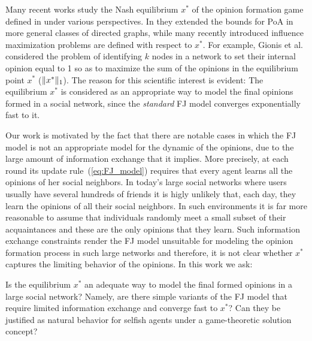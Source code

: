 Many recent works study the Nash equilibrium $x^*$
of the opinion formation game defined in \cite{BKO11}
under various perspectives. In \cite{CCL16} they extended the
bounds for PoA in more general classes of directed graphs, 
while many recently introduced influence maximization problems 
\cite{GTT13,AKPT18,MMT17} are defined with respect to $x^*$.
For example, Gionis et al. \cite{GTT13} considered the problem 
of identifying $k$ nodes in a network to set their internal 
opinion equal to 1 so as to maximize the sum
of the opinions in the equilibrium point $x^*$ ($\norm{1}{x^*}$).
The reason for this scientific interest is evident:
The equilibrium $x^*$ is considered as
an appropriate way to model the final opinions 
formed in a social network, since the \emph{standard} 
FJ model converges exponentially fast to it. 

Our work is motivated by the fact that there are notable cases
in which the FJ model is not an appropriate model for the dynamic of
the opinions, due to the  large amount of information exchange that it implies. 
More precisely, at each round its update 
rule~(\ref{eq:FJ_model}) requires that every agent learns all the opinions of her social neighbors.  In
today's large social networks where users usually have several hundreds of
friends it is higly unlikely that, each day, they learn the opinions of all their
social neighbors.  In such environments it is far more reasonable to assume
that individuals randomly meet a small subset of their acquaintances and these
are the only opinions that they learn. Such information exchange constraints
render the FJ model unsuitable for modeling the opinion formation process in
such large networks and therefore, it is not clear whether $x^*$ captures the
limiting behavior of the opinions. In this work we ask:
%
\begin{question}\label{q:motivation1}
  Is the equilibrium $x^*$ an adequate way to model the final formed opinions
  in a large social network? Namely, are there simple variants of the FJ model
  that require limited information exchange and converge fast to $x^*$? Can
  they be justified as natural behavior for selfish agents under a
  game-theoretic solution concept?
\end{question}

